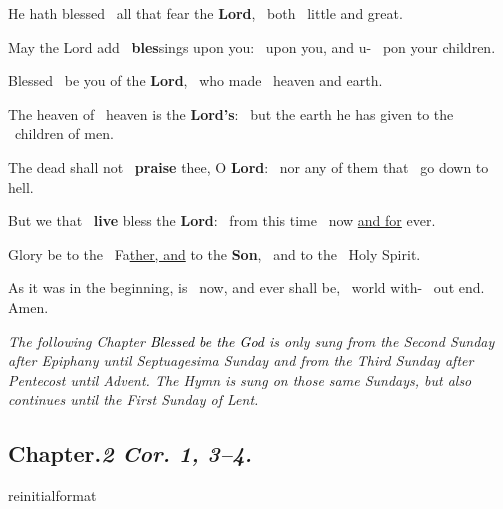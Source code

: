 \documentclass[12pt]{article} %
\newcommand{\myaboveinitial}[1]{%
    \expandafter\renewcommand\csname greinitialformat\endcsname[1]{%
        \fontsize{43}{43}\selectfont ##1
    }
    \gresetfirstlineaboveinitial{\textcolor{benred8}{\raisebox{6.0mm}{\small \textsc{\textbf{#1}}}}}{}
}
\def\noinitial{%
\gresetfirstlineaboveinitial{\textcolor{benred8}{\small \textsc{\textbf{}}}}{\textcolor{benred8}{\small \textsc{\textbf{}}}}
\setspaceafterinitial{0pt plus 0em minus 0em}%
\setspacebeforeinitial{0pt plus 0em minus 0em}%
\relax %
}
\newenvironment{psalmtext}{\leftskip 0.25in}{\vspace{1 mm}}
\newenvironment{rubric}{\vspace{1 mm}\color{benred8} \itshape \leftskip 0in \setlength{\parindent}{0.25in}}{\vspace{1 mm}}
\def\pipe{\textcolor{benred8}{\textdoublepipe}}
\let\oldgresixstar\gresixstar
\renewcommand{\gresixstar}{\textcolor{benred8}{\oldgresixstar}}
\def\capitulumSpace{\hspace{20 mm}}
\begin{document}
\begin{pages}
\begin{Rightside}
\begin{psalmtext}
He hath blessed \pipe\ all that fear the \textbf{Lord}, \gresixstar\ both \pipe\ little and great.

May the Lord add \pipe\ \textbf{bles}sings upon you: \gresixstar\ upon you, and u- \pipe\ pon your children.

Blessed \pipe\ be you of the \textbf{Lord}, \gresixstar\ who made \pipe\ heaven and earth.

The heaven of \pipe\ heaven is the \textbf{Lord's}: \gresixstar\ but the earth he has given to the \pipe\ children of men.

The dead shall not \pipe\ \textbf{praise} thee, O \textbf{Lord}: \gresixstar\ nor any of them that \pipe\ go down to hell.

But we that \pipe\ \textbf{live} bless the \textbf{Lord}: \gresixstar\ from this time \pipe\ now \uline{and for} ever.

Glory be to the \pipe\ Fa\uline{ther, and} to the \textbf{Son}, \gresixstar\ and to the \pipe\ Holy Spirit.

As it was in the beginning, is \pipe\ now, and ever shall be, \gresixstar\ world with- \pipe\ out end. Amen.

\end{psalmtext}

\pend\pstart

{\noinitial
{}
}

\pend\pstart

\begin{rubric}
The following Chapter \emph{\textcolor{black}{Blessed be the God}} is only sung from the Second Sunday after Epiphany until Septuagesima Sunday and from the Third Sunday after Pentecost until Advent. The Hymn is sung on those same Sundays, but also continues until the First Sunday of Lent.

\end{rubric}

\pend\pstart


\subsection*{Chapter.\capitulumSpace \emph{2 Cor. 1, 3--4.}}

\label{SundayChapter}

\pend\pstart

\myaboveinitial{}


\end{Rightside}
\end{pages}
\end{document}
